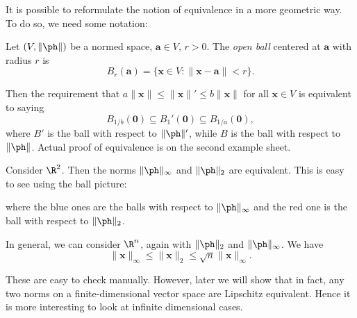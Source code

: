 \documentclass[a4paper]{article}
\begin{document}
It is possible to reformulate the notion of equivalence in a more geometric way. To do so, we need some notation:
\begin{defi}
  Let $(V, \|\ph \|)$ be a normed space, $\mathbf{a} \in V$, $r > 0$. The \emph{open ball} centered at $\mathbf{a}$ with radius $r$ is
  \[
    B_r(\mathbf{a}) = \{\mathbf{x}\in V: \|\mathbf{x} - \mathbf{a}\| < r\}.
  \]
\end{defi}
Then the requirement that $a\|\mathbf{x}\| \leq \|\mathbf{x}\|' \leq b\|\mathbf{x}\|$ for all $\mathbf{x}\in V$ is equivalent to saying
\[
  B_{1/b} (\mathbf{0}) \subseteq B_1'(\mathbf{0}) \subseteq B_{1/a}(\mathbf{0}),
\]
where $B'$ is the ball with respect to $\|\ph \|'$, while $B$ is the ball with respect to $\|\ph \|$. Actual proof of equivalence is on the second example sheet.

\begin{eg}
  Consider $\R^2$. Then the norms $\|\ph \|_\infty$ and $\|\ph \|_2$ are equivalent. This is easy to see using the ball picture:
  \begin{center}
  \end{center}
  where the blue ones are the balls with respect to $\|\ph \|_\infty$ and the red one is the ball with respect to $\|\ph \|_2$.

  In general, we can consider $\R^n$, again with $\|\ph \|_2$ and $\|\ph \|_\infty$. We have
  \[
    \|\mathbf{x}\|_\infty \leq \|\mathbf{x}\|_2 \leq \sqrt{n}\|\mathbf{x}\|_\infty.
  \]
\end{eg}
These are easy to check manually. However, later we will show that in fact, any two norms on a finite-dimensional vector space are Lipschitz equivalent. Hence it is more interesting to look at infinite dimensional cases.
\end{document}
